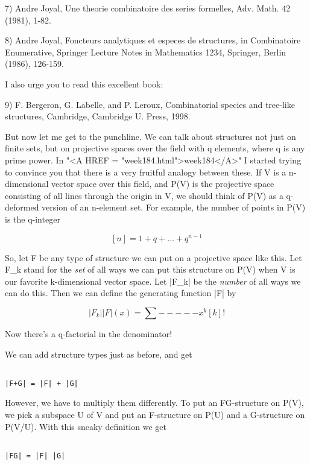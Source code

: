 7) Andre Joyal, Une theorie combinatoire des series formelles,
Adv. Math. 42 (1981), 1-82.

8) Andre Joyal, Foncteurs analytiques et especes de structures, 
in Combinatoire Enumerative, Springer Lecture Notes in Mathematics
1234, Springer, Berlin (1986), 126-159.

I also urge you to read this excellent book:

9) F. Bergeron, G. Labelle, and P. Leroux, Combinatorial species and
tree-like structures, Cambridge, Cambridge U. Press, 1998.

But now let me get to the punchline.  We can talk about structures not
just on finite sets, but on projective spaces over the field with  
q elements, where q is any prime power.  In "<A HREF = "week184.html">week184</A>" I started trying 
to convince you that there is a very fruitful analogy between these.
If V is a n-dimensional vector space over this field, and P(V) is the
projective space consisting of all lines through the origin in V, we
should think of P(V) as a q-deformed version of an n-element set.  For
example, the number of points in P(V) is the q-integer


$$

[n] = 1 + q + ... + q^{n-1}
$$
    

So, let F be any type of structure we can put on a projective space like
this.  Let F_{k} stand for the \emph{set} 
of all ways we can put this structure
on P(V) when V is our favorite k-dimensional vector space.  Let |F_{k}| be
the \emph{number} of all ways we can do this.  Then we can define the
generating function |F| by


$$

              |F_{k}| 
|F|(x) =  \sum  -----  x^{k}
              [k]!

$$
    
Now there's a q-factorial in the denominator! 

We can add structure types just as before, and get


\begin{verbatim}

|F+G| = |F| + |G|
\end{verbatim}
    
However, we have to multiply them differently.  To put an FG-structure
on P(V), we pick a subspace U of V and put an F-structure on P(U) and
a G-structure on P(V/U).  With this sneaky definition we get


\begin{verbatim}

|FG| = |F| |G| 
\end{verbatim}
    
